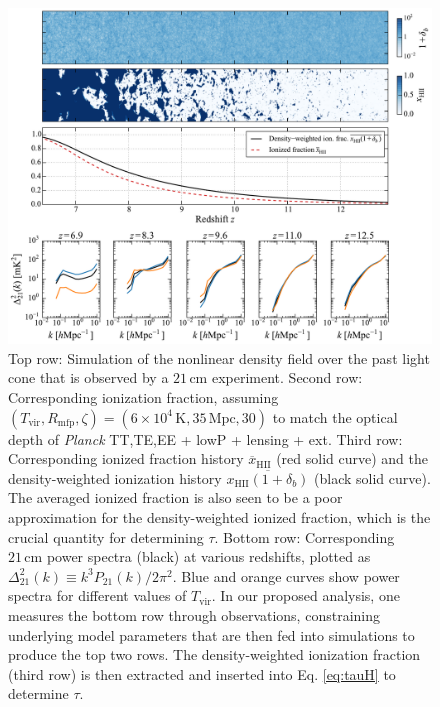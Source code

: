 \documentclass[twocolumn,aps,prd,nofootinbib,showpacs,superscriptaddress]{revtex4-1}
\begin{document}
\begin{figure}[!]
	\centering
	\includegraphics[width=1.0\textwidth]{figures/lightcones.pdf}
	\caption{Top row: Simulation of the nonlinear density field over the past light cone that is observed by a $21\,\textrm{cm}$ experiment. Second row: Corresponding ionization fraction, assuming $(T_\textrm{vir}, R_\textrm{mfp}, \zeta) = (6 \times 10^4\,\textrm{K}, 35\,\textrm{Mpc}, 30)$ to match the optical depth of \emph{Planck} TT,TE,EE + lowP + lensing + ext. Third row: Corresponding ionized fraction history $\overline{x}_\textrm{HII}$ (red solid curve) and the density-weighted ionization history $\overline{x_\textrm{HII} (1+ \delta_b)}$ (black solid curve). The averaged ionized fraction is also seen to be a poor approximation for the density-weighted ionized fraction, which is the crucial quantity for determining $\tau$. Bottom row: Corresponding $21\,\textrm{cm}$ power spectra (black) at various redshifts, plotted as $\Delta^2_{21} (k) \equiv k^3 P_{21}(k) / 2 \pi^2$. Blue and orange curves show power spectra for different values of $T_\textrm{vir}$. In our proposed analysis, one measures the bottom row through observations, constraining underlying model parameters that are then fed into simulations to produce the top two rows. The density-weighted ionization fraction (third row) is then extracted and inserted into Eq. \eqref{eq:tauH} to determine $\tau$.}
	\label{fig:Simulations}
\end{figure}
\end{document}
